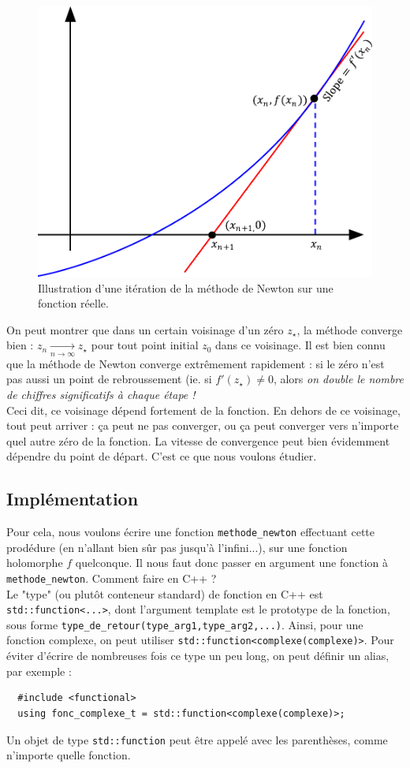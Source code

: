 \documentclass{book}
\newcommand{\inline}[1]{\texttt{#1}}
\begin{document}
\begin{figure}[H]
\centering
\includegraphics[width=0.5\linewidth]{TD2/newton_iteration.pdf}
\caption{Illustration d'une itération de la méthode de Newton sur une fonction réelle.}
\end{figure}

On peut montrer que dans un certain voisinage d'un zéro $z_\star$, la méthode converge bien : $z_n \xrightarrow[n\to\infty]{} z_\star$ pour tout point initial $z_0$ dans ce voisinage. Il est bien connu que la méthode de Newton converge extrêmement rapidement : si le zéro n'est pas aussi un point de rebroussement (ie. si $f'(z_\star) \neq 0$, alors \emph{on double le nombre de chiffres significatifs à chaque étape !}\\

Ceci dit, ce voisinage dépend fortement de la fonction. En dehors de ce voisinage, tout peut arriver : ça peut ne pas converger, ou ça peut converger vers n'importe quel autre zéro de la fonction. La vitesse de convergence peut bien évidemment dépendre du point de départ. C'est ce que nous voulons étudier.\\

\subsection{Implémentation}

Pour cela, nous voulons écrire une fonction \inline{methode_newton} effectuant cette prodédure (en n'allant bien sûr pas jusqu'à l'infini...), sur une fonction holomorphe $f$ quelconque. Il nous faut donc passer en argument une fonction à \inline{methode_newton}. Comment faire en C++ ?\\

Le "type" (ou plutôt conteneur standard) de fonction en C++ est \inline{std::function<...>}, dont l'argument template est le prototype de la fonction, sous forme \inline{type_de_retour(type_arg1,type_arg2,...)}. Ainsi, pour une fonction complexe, on peut utiliser \inline{std::function<complexe(complexe)>}. Pour éviter d'écrire de nombreuses fois ce type un peu long, on peut définir un alias, par exemple :
\begin{verbatim}
  #include <functional>
  using fonc_complexe_t = std::function<complexe(complexe)>;
\end{verbatim}
Un objet de type \inline{std::function} peut être appelé avec les parenthèses, comme n'importe quelle fonction.
\end{document}
